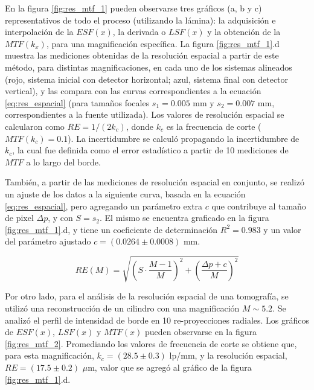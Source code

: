 En la figura \ref{fig:res_mtf_1} pueden observarse tres gráficos (a, b y c) representativos de
todo el proceso (utilizando la lámina): la adquisición e interpolación de la $ESF(x)$, la derivada o $LSF(x)$
y la obtención de la $MTF(k_x)$, para una magnificación específica. La figura \ref{fig:res_mtf_1}.d
muestra las mediciones obtenidas de la resolución espacial a partir de este método, para
distintas magnificaciones, en cada uno de los sistemas alineados (rojo, sistema inicial con
detector horizontal; azul, sistema final con detector vertical), y las compara con las curvas correspondientes a la ecuación
\ref{eq:res_espacial} (para tamaños focales $s_1 = 0.005$ mm y $s_2 = 0.007$ mm, correspondientes a
la fuente utilizada). Los valores de resolución
espacial se calcularon como $RE = 1/(2k_c)$, donde $k_c$ es la frecuencia de corte ($MTF(k_c)=0.1$).
La incertidumbre se calculó propagando la incertidumbre de $k_c$, la cual fue definida como
el error estadístico a partir de 10 mediciones de $MTF$ a lo largo del borde.

También, a partir de las mediciones de resolución espacial en conjunto, se realizó un ajuste de los
datos a la siguiente curva, basada en la ecuación \ref{eq:res_espacial}, pero agregando un parámetro
extra $c$ que contribuye al tamaño de pixel $\Delta p$, y con $S=s_2$. El mismo se encuentra
graficado en la figura \ref{fig:res_mtf_1}.d, y tiene un coeficiente de determinación $R^2 = 0.983$ y
un valor del parámetro ajustado $c=(0.0264 \pm 0.0008)$ mm.

\begin{equation}
    RE(M) = \sqrt{\left(S\cdot\dfrac{M-1}{M}\right)^2 + \left(\dfrac{\Delta p+c}{M}\right)^2}
    \label{eq:ajuste_resolucion}
\end{equation}

Por otro lado, para el análisis de la resolución espacial de una tomografía, se utilizó una
reconstrucción de un cilindro con una magnificación $M\sim 5.2$. Se analizó el perfil
de intensidad de borde en 10 re-proyecciones radiales. Los gráficos de $ESF(x)$, $LSF(x)$
y $MTF(x)$ pueden observarse en la figura \ref{fig:res_mtf_2}. Promediando los valores
de frecuencia de corte se obtiene que, para esta magnificación, $k_c = (28.5 \pm 0.3)$ lp/mm,
y la resolución espacial, $RE = (17.5 \pm 0.2)$ $\mu$m, valor que se agregó al gráfico de la
figura \ref{fig:res_mtf_1}.d.

